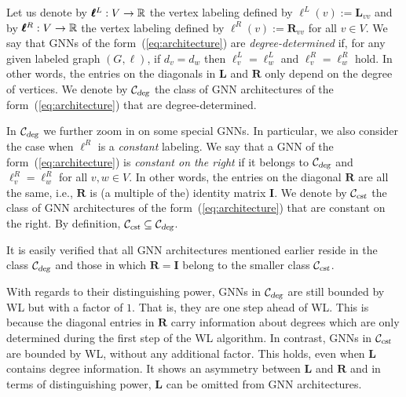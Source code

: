Let us denote by $\pmb{\ell}^L:V\to \mathbb{R}$ the vertex labeling defined by $\pmb{\ell}^L(v):=\mathbf{L}_{vv}$ and by $\pmb{\ell}^R:V\to \mathbb{R}$ the vertex labeling defined by 
$\pmb{\ell}^R(v):=\mathbf{R}_{vv}$ for all $v\in V$. We say that GNNs of the form~(\ref{eq:architecture}) are \textit{degree-determined} if, for any given  labeled graph $(G,\pmb{\ell})$, if $d_v=d_w$ then $\pmb{\ell}^L_v=\pmb{\ell}^L_w$ and $\pmb{\ell}^R_v=\pmb{\ell}^R_w$ hold. In other words,
the entries on the diagonals in $\mathbf{L}$ and $\mathbf{R}$ only depend on the degree of vertices.
We denote by ${\cal C}_{\textsl{deg}}$ the class of GNN architectures of the form~(\ref{eq:architecture}) that are degree-determined.

In ${\cal C}_{\textsl{deg}}$ we further zoom in on some special GNNs.
In particular, we also consider the case when  $\pmb{\ell}^R$ is a 
\textit{constant} labeling. We say that a  GNN of the form~(\ref{eq:architecture}) is \textit{constant on the right} if
it belongs to ${\cal C}_{\textsl{deg}}$ and
$\pmb{\ell}^R_v=\pmb{\ell}^R_w$ for all $v,w\in V$. In other words, the entries on the diagonal $\mathbf{R}$ are all the same, i.e., $\mathbf{R}$ is (a multiple of the) identity matrix $\mathbf{I}$.
We denote by ${\cal C}_{\textsl{cst}}$ the class of GNN architectures of the form~(\ref{eq:architecture}) that are constant on the right. By definition,
${\cal C}_{\textsl{cst}}\subseteq {\cal C}_{\textsl{deg}}$.

It is easily verified that all GNN architectures
mentioned earlier reside in the class ${\cal C}_{\textsl{deg}}$ and those
in which $\mathbf{R}=\mathbf{I}$  belong to 
the smaller class ${\cal C}_{\textsl{cst}}$.


With regards to their distinguishing power, GNNs in ${\cal C}_{\textsl{deg}}$
are still bounded by WL but with a factor of $1$. That is, they are one step ahead of WL. This is because  the diagonal entries in $\mathbf{R}$ carry information about degrees which are only determined during the first step of the WL algorithm. In contrast, GNNs in ${\cal C}_{\textsl{cst}}$ are bounded by WL, without any additional factor. This holds, even when $\mathbf{L}$ contains degree information. It shows an asymmetry between $\mathbf{L}$ and $\mathbf{R}$
and in terms of distinguishing power, $\mathbf{L}$ can be omitted from GNN architectures. 

